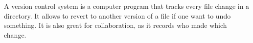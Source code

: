 A version control system is a computer program that tracks every file change in a directory. It allows to revert to another version of a file if one want to undo something. It is also great for collaboration, as it records who made which change.
